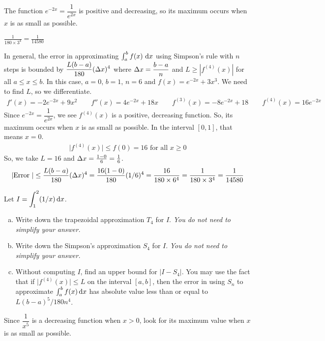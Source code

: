 \begin{hint}
The function $e^{-2x} = \dfrac{1}{e^{2x}}$ is positive and decreasing, so its maximum occurs when $x$ is as small as possible.
\end{hint}

\begin{answer}
$\displaystyle\frac{1}{180\times 3^4}
  =\frac{1}{14580}$
\end{answer}

\begin{solution}
In general, the error in approximating
$\int_a^b f(x)\ \mathrm{d}x$ using Simpson's rule with $n$
steps is bounded by $\displaystyle\frac{L(b-a)}{180}(\Delta x)^4$ where $\Delta x=\dfrac{b-a}{n}$
and $L\ge |f^{(4)}(x)|$ for all $a\le x\le b$. In this case, $a=0$, $b=1$,
$n=6$ and $f(x)=e^{-2x}+3x^3$. We need to find $L$, so we differentiate.
\begin{align*}
f'(x)=-2e^{-2x}+9x^2\qquad
f''(x)=4e^{-2x}+18x\qquad
f^{(3)}(x)=-8e^{-2x}+18\qquad
f^{(4)}(x)= 16 e^{-2x}
\end{align*}
Since $e^{-2x} = \dfrac{1}{e^{2x}}$, we see $f^{(4)}(x)$ is a positive, decreasing function. So, its maximum occurs when $x$ is as small as possible. In the interval $[0,1]$, that means $x=0$.
\begin{align*}
\big|f^{(4)}(x)\big|\le f(0)=16\text{ for all }x\ge 0
\end{align*}
So, we  take $L=16$ and $\Delta x=\frac{1-0}{6}=\frac{1}{6}$.
\begin{align*}
|\text{Error }|\le \frac{L(b-a)}{180}(\Delta x)^4=\frac{16(1-0)}{180}(1/6)^4
   =\frac{16}{180\times 6^4}
   =\frac{1}{180\times 3^4}
  =\frac{1}{14580}
\end{align*}
\end{solution}

\begin{question}[2012A]
Let $I=\displaystyle\int_1^2 (1/x)\,\mathrm{d}x$.

\begin{enumerate}[(a)]
\item
Write down the trapezoidal approximation $T_4$ for $I$.
\emph{You do not need to simplify your answer.}

\item
Write down the Simpson's approximation $S_4$ for $I$.
\emph{You do not need to simplify your answer.}

\item
Without computing $I$, find an upper bound for $|I - S_4|$.
You may use the fact that if $\big|f^{(4)}(x)\big|\le L$
on the interval $[a, b]$, then the error in using $S_n$ to approximate
$\int_a^b f(x)\,\mathrm{d}x$ has absolute value less than or equal to
$L(b-a)^5/180n^4$.
\end{enumerate}
\end{question}
Since $\dfrac{1}{x^5}$ is a decreasing function when $x>0$, look for its maximum value when $x$ is as small as possible.
\begin{hint}
\end{hint}

